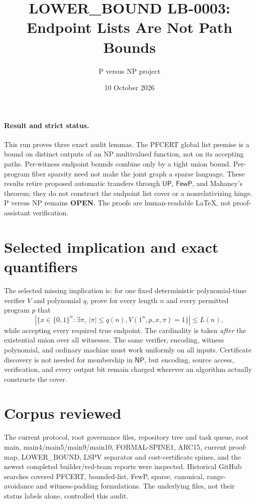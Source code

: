 \documentclass[11pt]{article}
\title{LOWER\_BOUND LB-0003: Endpoint Lists Are Not Path Bounds}
\author{P versus NP project}
\date{10 October 2026}
\newcommand{\NP}{\mathsf{NP}}
\begin{document}
\maketitle

\paragraph{Result and strict status.}
This run proves three exact audit lemmas.  The PFCERT global list premise
is a bound on distinct outputs of an NP multivalued function, not on its
accepting paths.  Per-witness endpoint bounds combine only by a tight
union bound.  Per-program fiber sparsity need not make the joint graph a
sparse language.  These results retire proposed automatic transfers
through $\mathsf{UP}$, $\mathsf{FewP}$, and Mahaney's theorem; they do not
construct the endpoint list cover or a nonrelativizing hinge.
P versus NP remains \textbf{OPEN}.  The proofs are human-readable LaTeX,
not proof-assistant verification.

\section{Selected implication and exact quantifiers}
The selected missing implication is: for one fixed deterministic
polynomial-time verifier $V$ and polynomial $q$, prove for every length
$n$ and every permitted program $p$ that
\[
 \left|\{x\in\{0,1\}^n:\exists\pi,\ |\pi|\le q(n),
                  V(1^n,p,x,\pi)=1\}\right|\le L(n),
\]
while accepting every required true endpoint.  The cardinality is taken
\emph{after} the existential union over all witnesses.  The same verifier,
encoding, witness polynomial, and ordinary machine must work uniformly
on all inputs.  Certificate discovery is not needed for membership in
$\NP$, but encoding, source access, verification, and every output bit
remain charged wherever an algorithm actually constructs the cover.

\section{Corpus reviewed}
The current protocol, root governance files, repository tree and task
queue, root main, main4/main5/main9/main10, FORMAL-SPINE1, ARC15, current
proof-map, LOWER\_BOUND, LSPV separator and cost-certificate spines, and
the newest completed builder/red-team reports were inspected.  Historical
GitHub searches covered PFCERT, bounded-list, FewP, sparse, canonical,
range-avoidance and witness-padding formulations.  The underlying files,
not their status labels alone, controlled this audit.
\end{document}
